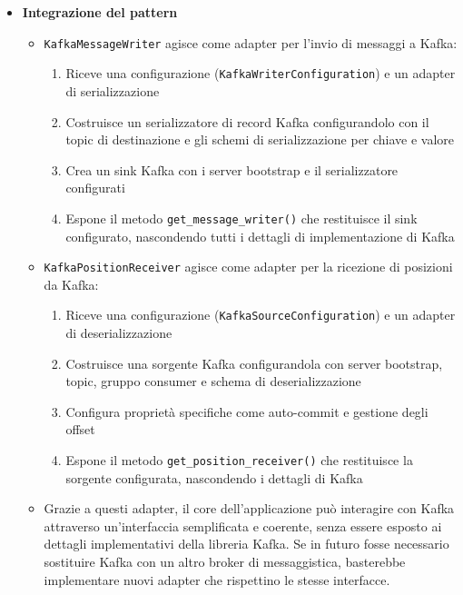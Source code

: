 \documentclass[10pt]{article}
\begin{document}
\begin{itemize}
    \item \textbf{Integrazione del pattern}
    \begin{itemize}
        \item \texttt{KafkaMessageWriter} agisce come adapter per l'invio di messaggi a Kafka:
        \begin{enumerate}
            \item Riceve una configurazione (\texttt{KafkaWriterConfiguration}) e un adapter di serializzazione
            \item Costruisce un serializzatore di record Kafka configurandolo con il topic di destinazione e gli schemi di serializzazione per chiave e valore
            \item Crea un sink Kafka con i server bootstrap e il serializzatore configurati
            \item Espone il metodo \texttt{get\_message\_writer()} che restituisce il sink configurato, nascondendo tutti i dettagli di implementazione di Kafka
        \end{enumerate}
        
        \item \texttt{KafkaPositionReceiver} agisce come adapter per la ricezione di posizioni da Kafka:
        \begin{enumerate}
            \item Riceve una configurazione (\texttt{KafkaSourceConfiguration}) e un adapter di deserializzazione
            \item Costruisce una sorgente Kafka configurandola con server bootstrap, topic, gruppo consumer e schema di deserializzazione
            \item Configura proprietà specifiche come auto-commit e gestione degli offset
            \item Espone il metodo \texttt{get\_position\_receiver()} che restituisce la sorgente configurata, nascondendo i dettagli di Kafka
        \end{enumerate}
        
        \item Grazie a questi adapter, il core dell'applicazione può interagire con Kafka attraverso un'interfaccia semplificata e coerente, senza essere esposto ai dettagli implementativi della libreria Kafka. Se in futuro fosse necessario sostituire Kafka con un altro broker di messaggistica, basterebbe implementare nuovi adapter che rispettino le stesse interfacce.
    \end{itemize}
    \end{itemize}
\end{document}
